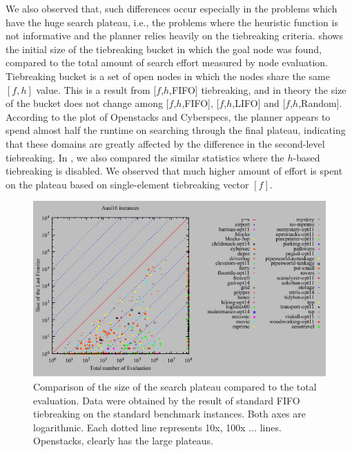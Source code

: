 We also observed that, such differences occur especially in the problems which
have the huge search plateau, i.e., the problems where the heuristic
function is not informative and the planner relies heavily on the
tiebreaking criteria.
% 
 shows the initial size of the
tiebreaking bucket in which the goal node was found, compared to the
total amount of search effort measured by node evaluation.
Tiebreaking bucket is a set of open nodes in which the nodes share
the same $[f,h]$ value.
This is a result from [$f$,$h$,FIFO] tiebreaking, and in theory the size of the bucket
does not change among [$f$,$h$,FIFO], [$f$,$h$,LIFO] and [$f$,$h$,Random].
% 
% 
According to the plot of Openstacks and Cyberspecs, 
the planner appears to spend almost half the runtime on searching through the final
plateau, indicating that these domains are greatly affected by the difference in the
second-level tiebreaking.
In , we also compared the similar statistics where the $h$-based tiebreaking is disabled. We observed that much higher amount of effort is spent on the plateau based on single-element tiebreaking vector $[f]$.

\begin{figure}[htbp]
 \centering
 \includegraphics{tables/aaai16-front-vs-evaluated.pdf}
 \caption{Comparison of the size of the search plateau compared to the total evaluation. Data were obtained by the result of standard FIFO tiebreaking on the standard benchmark instances. Both axes are logarithmic. Each dotted line represents 10x, 100x ... lines.  Openstacks,  clearly has the large plateaus.}
 \label{plateau-h}
\end{figure}
% 



